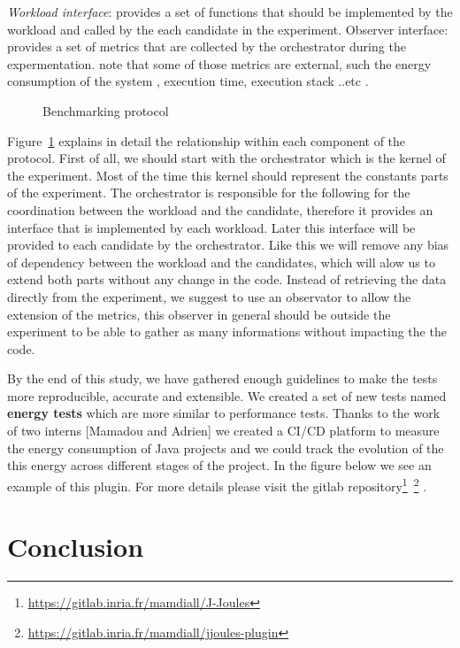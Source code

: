 \emph{Workload interface}: provides a set of functions that should be implemented by the workload  and called by the each candidate in the experiment.
Observer interface: provides a set of metrics that are collected by the orchestrator during the expermentation. note that some of those metrics are external, such the energy consumption of the system , execution time, execution stack ..etc .
\begin{figure}[!htb]
    \caption{Benchmarking protocol}\label{fig:benchmarkingprotocol}
\end{figure}
Figure~\ref{fig:benchmarkingprotocol} explains in detail the relationship within each component of the protocol.
First of all, we should start with the orchestrator which is the kernel of the experiment. Most of the time this kernel should represent the constants parts of the experiment.
The orchestrator is responsible for the following  for the coordination between the workload and the candidate, therefore it provides an interface that is implemented by each workload.
Later this interface will be provided to each candidate by the orchestrator. Like this we will remove any bias of dependency between the workload and the candidates, which will alow us to extend both parts without any change in the code.
Instead of retrieving the data directly from the experiment, we suggest to use an observator to allow the extension of the metrics, this observer in general should be outside the experiment to be able to gather as many informations without impacting the the code.


By the end of this study, we have gathered enough guidelines to make the tests more reproducible, accurate and extensible.
We created a set of new tests named \textbf{energy tests} which are more similar to performance tests.
Thanks to the work of two interns [Mamadou and Adrien] we created a CI/CD platform to measure the energy consumption of Java projects and we could track the evolution of the this energy across different stages of the project.
In the figure below we see an example of this plugin.
For more details please visit the gitlab repository\footnote{\url{https://gitlab.inria.fr/mamdiall/J-Joules}}~\footnote{\url{https://gitlab.inria.fr/mamdiall/jjoules-plugin}} .

\section{Conclusion}